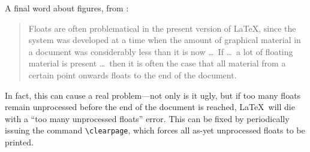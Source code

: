 A final word about figures, from \citet[p141 ff]{goosens94}:
\begin{quotation}
Floats are often problematical in the present version of \LaTeX,
since the system was developed at a time when the amount of graphical
material in a document was considerably less than it is now \ldots\
If \ldots\ a lot of floating material is present \ldots\ then it is often
the case that all material from a certain point onwards floats to the
end of the document.
\end{quotation}
In fact, this can cause a real problem---not only is it ugly, but if
too many floats remain unprocessed before the end of the document is
reached, \LaTeX\ will die with a ``too many unprocessed floats'' error.
This can be fixed by periodically issuing the command
\verb|\clearpage|, which forces all as-yet unprocessed floats to be
printed.
